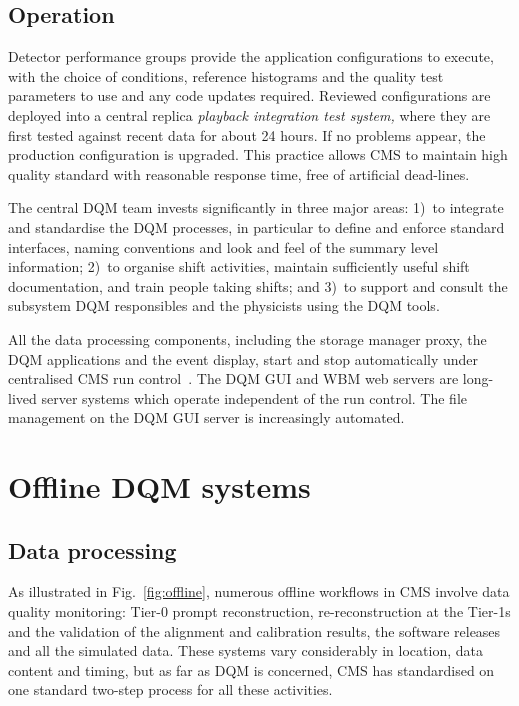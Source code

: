 \documentclass[a4paper]{jpconf}
\begin{document}
\subsection{Operation}

Detector performance groups provide the application configurations to execute,
with the choice of conditions, reference histograms and the quality test
parameters to use and any code updates required.  Reviewed configurations are
deployed into a central replica {\em playback integration test system,} where
they are first tested against recent data for about 24 hours.  If no problems
appear, the production configuration is upgraded.  This practice allows CMS to
maintain high quality standard with reasonable response time, free of
artificial dead-lines.

The central DQM team invests significantly in three major areas: 1)~to
integrate and standardise the DQM processes, in particular to define and
enforce standard interfaces, naming conventions and look and feel of the
summary level information; 2)~to organise shift activities, maintain
sufficiently useful shift documentation, and train people taking shifts; and
3)~to support and consult the subsystem DQM responsibles and the physicists
using the DQM tools.

All the data processing components, including the storage manager proxy, the
DQM applications and the event display, start and stop automatically under
centralised CMS run control~\cite{runcontrol}.  The DQM GUI and WBM web
servers are long-lived server systems which operate independent of the run
control.  The file management on the DQM GUI server is increasingly automated.


\section{Offline DQM systems}
\subsection{Data processing}

As illustrated in Fig.~\ref{fig:offline}, numerous offline workflows in CMS
involve data quality monitoring: Tier-0 prompt reconstruction,
re-reconstruction at the Tier-1s and the validation of the alignment and
calibration results, the software releases and all the simulated data.  These
systems vary considerably in location, data content and timing, but as far as
DQM is concerned, CMS has standardised on one standard two-step process for
all these activities.
\end{document}
